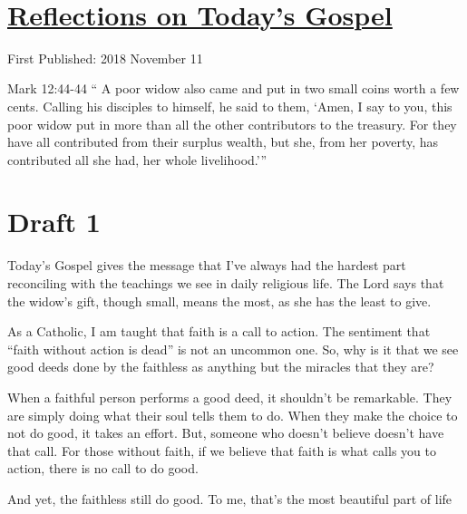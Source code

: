 \documentclass[12pt]{article}[titlepage]
\newcommand{\say}[1]{``#1''}
\newcommand{\nsay}[1]{`#1'}
\newcommand{\1}{\={a}}
\newcommand{\2}{\={e}}
\newcommand{\3}{\={\i}}
\newcommand{\4}{\=o}
\newcommand{\5}{\=u}
\newcommand{\6}{\={A}}
\renewcommand{\,}{\textsuperscript{,}}
\begin{document}

\doublespacing
\section{\href{reflections-on-readings-32-ordinary-b.html}{Reflections on Today's Gospel}}
First Published: 2018 November 11

Mark 12:44-44 \say{
A poor widow also came and put in two small coins worth a few cents.
Calling his disciples to himself, he said to them, \nsay{Amen, I say to you, this poor widow put in more than all the other contributors to the treasury.
For they have all contributed from their surplus wealth, but she, from her poverty, has contributed all she had, her whole livelihood.}}
\section{Draft 1}
Today's Gospel gives the message that I've always had the hardest part reconciling with the teachings we see in daily religious life.
The Lord says that the widow's gift, though small, means the most, as she has the least to give.

As a Catholic, I am taught that faith is a call to action.
The sentiment that \say{faith without action is dead} is not an uncommon one.
So, why is it that we see good deeds done by the faithless as anything but the miracles that they are?

When a faithful person performs a good deed, it shouldn't be remarkable.
They are simply doing what their soul tells them to do.
When they make the choice to not do good, it takes an effort.
But, someone who doesn't believe doesn't have that call.
For those without faith, if we believe that faith is what calls you to action, there is no call to do good.

And yet, the faithless still do good.
To me, that's the most beautiful part of life
\end{document}
